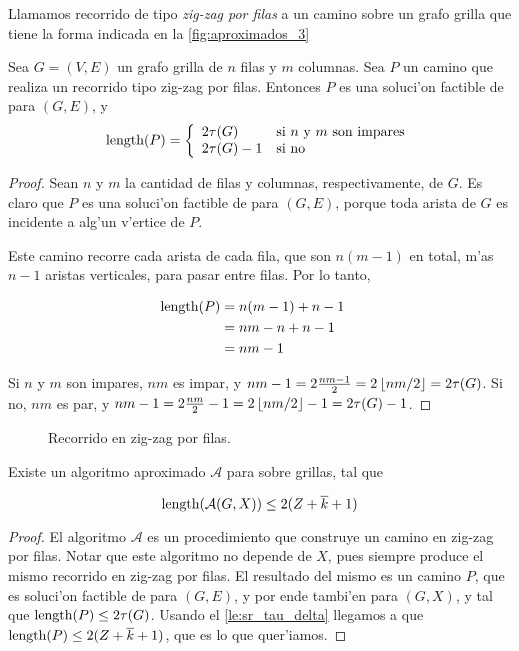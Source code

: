 Llamamos recorrido de tipo \textit{zig-zag por filas} a un camino sobre un grafo grilla que tiene la forma indicada en la \autoref{fig:aproximados_3}

\begin{theorem}
\label{th:zig_zag_filas}
Sea $G = (V, E)$ un grafo grilla de $n$ filas y $m$ columnas. Sea $P$ un camino que realiza un recorrido tipo zig-zag por filas. Entonces $P$ es  una soluci'on factible de  para $(G, E)$, y
\[
\textnormal{length}(P) = \left\{
	\begin{array}{ll}
		2 \tau(G) & \mbox{si } n \text{ y } m \text{ son impares}\\
		2 \tau(G) - 1 & \mbox{si no}
	\end{array}
\right.
\]

\begin{proof}
Sean $n$ y $m$ la cantidad de filas y columnas, respectivamente, de $G$. Es claro que $P$ es una soluci'on factible de  para $(G, E)$, porque toda arista de $G$ es incidente a alg'un v'ertice de $P$.

Este camino recorre cada arista de cada fila, que son $n(m - 1)$ en total, m'as $n - 1$ aristas verticales, para pasar entre filas. Por lo tanto,

\begin{align*}
\textnormal{length}(P) &= n(m - 1) + n - 1 &\\
&= nm - n + n - 1 &\\
&= nm - 1
\end{align*}

\noindent
Si $n$ y $m$ son impares, $nm$ es impar, y $nm - 1 = 2\frac{nm - 1}{2} = 2 \left\lfloor nm / 2 \right\rfloor = 2 \tau(G)$. Si no, $nm$ es par, y $nm - 1 = 2 \frac{nm}{2} - 1 = 2 \left\lfloor nm / 2 \right\rfloor - 1 = 2 \tau(G) - 1$. 

\end{proof}
\end{theorem}

\begin{figure}[h]
	\begin{center}
		
	\end{center}		
	\caption{Recorrido en zig-zag por filas.}
	\label{fig:aproximados_3}
\end{figure}

\begin{theorem}
\label{th:aproximacion_clientes_denso}
Existe un algoritmo aproximado $\mathcal{A}$ para  sobre grillas, tal que

\[\textnormal{length}(\mathcal{A}(G, X)) \leq 2(Z + \overline{k} + 1)\]

\begin{proof}
El algoritmo $\mathcal{A}$ es un procedimiento que construye un camino en zig-zag por filas. Notar que este algoritmo no depende de $X$, pues siempre produce el mismo recorrido en zig-zag por filas. El resultado del mismo es un camino $P$, que es soluci'on factible de  para $(G, E)$, y por ende tambi'en para $(G, X)$, y tal que $\textnormal{length}(P) \leq 2 \tau(G)$. Usando el \autoref{le:sr_tau_delta} llegamos a que $\textnormal{length}(P) \leq 2 (Z + \overline{k} + 1)$, que es lo que quer'iamos.
\end{proof}
\end{theorem}

